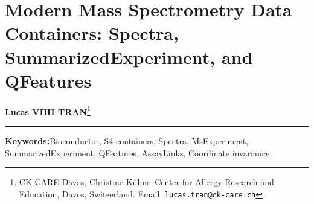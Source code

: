 \documentclass[11pt,twoside,openright]{book}
\begin{document}
\setcounter{chapter}{5}
\chapter{Modern Mass Spectrometry Data Containers: Spectra, SummarizedExperiment, and QFeatures}
\label{chap:data_containers}

\noindent
\textbf{Lucas VHH TRAN}\footnote{CK-CARE Davos, Christine K\"uhne--Center for Allergy Research and Education, Davos, Switzerland. Email: \texttt{lucas.tran@ck-care.ch}}\\
\rule{\textwidth}{0.8pt}

\begin{abstract}
\noindent
Mass spectrometry data structures must coordinate high-volume spectral time-series, multi-sample experimental designs, and multi-tier molecular parsimony hierarchies without desynchronization. Flattening spectral measurements into unstructured tables drops parent-child linkages, creating silent indexing errors during filtering and statistical modeling. In R 4.6.1 and Bioconductor 3.20 \cite{gentleman2004bioconductor, huber2015orchestrating}, four interoperable S4 classes \cite{chambers2008software} manage the computational lifecycle of mass spectrometry data. The \texttt{Spectra} container stores raw scans using lazy on-disk evaluation \cite{gatto2021spectra}. The \texttt{MsExperiment} class couples raw spectral streams to experimental design factors and sample injection sequences \cite{rainer2022msexperiment}. The \texttt{SummarizedExperiment} container structures feature-by-sample quantitative matrices, enforcing coordinate invariance across row-level annotations (\texttt{rowData}) and column-level phenotypes (\texttt{colData}) \cite{huber2015orchestrating}. For bottom-up proteomics, the \texttt{QFeatures} container organizes peptide-spectrum matches, unique peptides, and protein groups into an auditable relational graph via \texttt{AssayLinks} \cite{gatto2023qfeatures, vanderaa2021reproducible}. This chapter establishes the mathematical definitions, coordinate invariants, and executable implementations of these modern data containers, demonstrating multi-tier aggregation \cite{cox2014maxquant, goeminne2016msqrob} and seamless transfer into downstream statistical modeling \cite{smyth2004limma, zhu2020deqms}.
\end{abstract}

\vspace{1em}
\noindent\textbf{Keywords:}\enspace Bioconductor, S4 containers, Spectra, MsExperiment, SummarizedExperiment, QFeatures, AssayLinks, Coordinate invariance.
\end{document}
